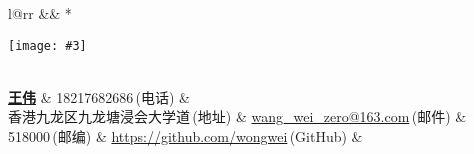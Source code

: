 \newcommand{\paint}[3]{
    \begin{minipage}{#1}
        \texttt{[image: \#3]}
    \end{minipage} 
}
\newcommand{\myheader}{
\begin{tabular*}{\textwidth}{l@{\extracolsep{\fill}}rr}
  && \multirow{4}*{\paint{2.6cm}{3.2cm}{./证件照.jpg}}\\
  \specialrule{0em}{4pt}{4pt}
  \textbf{\href{}{\LARGE 王伟}} & 18217682686$\,${\color{labelgrey}(电话)} &\\
  香港九龙区九龙塘浸会大学道$\,${\color{labelgrey}(地址)} & \href{mailto:wang\_wei\_zero@163.com}{wang\_wei\_zero@163.com}$\,${\color{labelgrey}(邮件)} & \\
  518000$\,${\color{labelgrey}(邮编)} & \href{https://github.com/wongwei}{https://github.com/wongwei}$\,${\color{labelgrey}(GitHub)} & \\
  \end{tabular*}\\\vspace{0.1in}
}

\myheader

